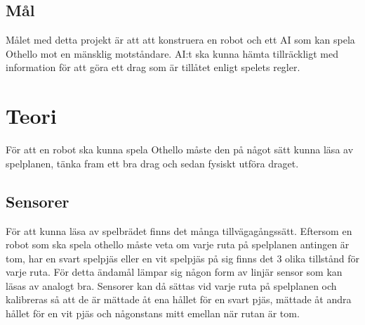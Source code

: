 \documentclass[a4paper]{article}
\begin{document}
\subsection{Mål}
Målet med detta projekt är att att konstruera en robot och ett AI som kan spela Othello mot en mänsklig motståndare.
AI:t ska kunna hämta tillräckligt med information för att göra ett drag som är tillåtet enligt spelets regler.

\section{Teori}
För att en robot ska kunna spela Othello måste den på något sätt kunna läsa av spelplanen, tänka fram ett bra drag och sedan fysiskt utföra draget.

\subsection{Sensorer}
För att kunna läsa av spelbrädet finns det många tillvägagångssätt.
Eftersom en robot som ska spela othello måste veta om varje ruta på spelplanen antingen är tom, har en svart spelpjäs eller en vit spelpjäs på sig finns det 3 olika tillstånd för varje ruta.
För detta ändamål lämpar sig någon form av linjär sensor som kan läsas av analogt bra.
Sensorer kan då sättas vid varje ruta på spelplanen och kalibreras så att de är mättade åt ena hållet för en svart pjäs,  mättade åt andra hållet för en vit pjäs och någonstans mitt emellan när rutan är tom.
\end{document}
